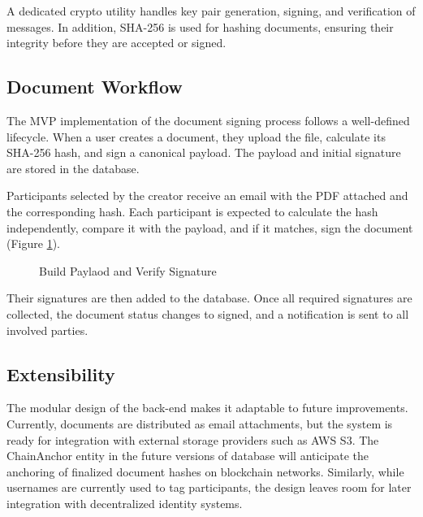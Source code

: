 A dedicated crypto utility handles key pair generation, signing, and verification of messages. In addition, SHA-256 is used for hashing documents, ensuring their integrity before they are accepted or signed.

\subsection{Document Workflow}
The MVP implementation of the document signing process follows a well-defined lifecycle. When a user creates a document, they upload the file, calculate its SHA-256 hash, and sign a canonical payload. The payload and initial signature are stored in the database.

Participants selected by the creator receive an email with the PDF attached and the corresponding hash. Each participant is expected to calculate the hash independently, compare it with the payload, and if it matches, sign the document (Figure \ref{payload-signature}). 

\begin{figure}[H]
    \centering
    \caption{Build Paylaod and Verify Signature}
    \label{payload-signature}
\end{figure}

Their signatures are then added to the database. Once all required signatures are collected, the document status changes to signed, and a notification is sent to all involved parties.

\subsection{Extensibility}
The modular design of the back-end makes it adaptable to future improvements. Currently, documents are distributed as email attachments, but the system is ready for integration with external storage providers such as AWS S3. The ChainAnchor entity in the future versions of database will anticipate the anchoring of finalized document hashes on blockchain networks. Similarly, while usernames are currently used to tag participants, the design leaves room for later integration with decentralized identity systems.

